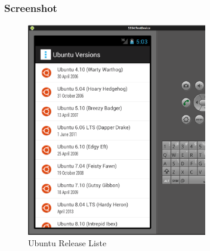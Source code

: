 \begin{frame}
   \frametitle{Screenshot}
   \begin{figure}[h!]
     \centering
     \includegraphics[width=0.7\textwidth]{pictures/ubuntu_version_adapter.ps}
     \caption{
        Ubuntu Release Liste
     }
     \label{fig:ubuntu_version_adapter}
   \end{figure}
\end{frame}
